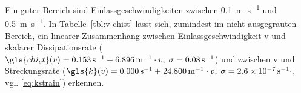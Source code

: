 Ein guter Bereich sind Einlassgeschwindigkeiten zwischen \SI{0.1}{\meter\per\second} und \SI{0.5}{\meter\per\second}. In Tabelle~\ref{tbl:v-chist} lässt sich, zumindest im nicht ausgegrauten Bereich, ein linearer Zusammenhang zwischen Einlassgeschwindigkeit \gls{v} und skalarer Dissipationsrate ($\gls{chi_st}(v) = \SI{0.153}{\per\second} + \SI{6.896}{\per\meter} \cdot v,\;\sigma = \SI{0.08}{\per\second}$) und zwischen \gls{v} und Streckungsrate ($\gls{k}(v) = \SI{0.000}{\per\second} + \SI{24.800}{\per\meter} \cdot v,\;\sigma = \SI{2.6e-7}{\per\second} \cdot $, vgl. \autoref{eq:kstrain}) erkennen.
